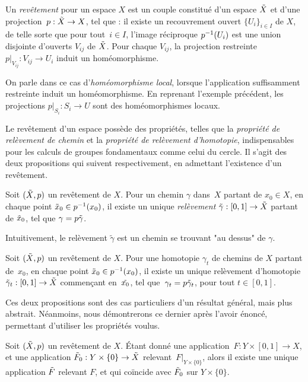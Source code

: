 \begin{definition}
Un \emph{revêtement} pour un espace $X$ est un couple constitué d'un espace $\Tilde{X}$ et d'une projection~$p:\Tilde{X}\to X$, tel que : il existe un recouvrement ouvert $\{U_i\}_{i\in I}$ de $X$, de telle sorte que pour tout~$i\in I$, l'image réciproque $p^{-1}(U_i)$ est une union disjointe d'ouverts $V_{ij}$ de $\Tilde{X}$. Pour chaque $V_{ij}$, la projection restreinte $p|_{V_{ij}}:V_{ij}\to U_i$ induit un homéomorphisme.
\end{definition}

On parle dans ce cas d'\emph{homéomorphisme local}, lorsque l'application suffisamment restreinte induit un homéomorphisme. En reprenant l'exemple précédent, les projections $p|_{S_i}:S_i\to U$ sont des homéomorphismes locaux.

\bigskip Le revêtement d'un espace possède des propriétés, telles que la \emph{propriété de relèvement de chemin} et la \emph{propriété de relèvement d'homotopie}, indispensables pour les calculs de groupes fondamentaux comme celui du cercle. Il s'agit des deux propositions qui suivent respectivement, en admettant l'existence d'un revêtement.

\begin{proposition}\label{prop:rel-path}
Soit $(\Tilde{X},p)$ un revêtement de $X$. Pour un chemin $\gamma$ dans~$X$ partant de $x_0\in X$, en chaque point $\Tilde{x}_0\in p^{-1}(x_0)$, il existe un unique \emph{relèvement} $\Tilde{\gamma}:[0,1]\to\Tilde{X}$ partant de $\Tilde{x}_0$, tel que $\gamma=p\Tilde{\gamma}$.
\end{proposition}

Intuitivement, le relèvement $\tilde{\gamma}$ est un chemin se trouvant "au dessus" de $\gamma$.

\begin{proposition}\label{prop:rel-hom}
Soit $(\Tilde{X},p)$ un revêtement de $X$. Pour une homotopie $\gamma_t$ de chemins de $X$ partant de~$x_0$, en chaque point $\Tilde{x}_0\in p^{-1}(x_0)$, il existe un unique relèvement d'homotopie $\Tilde{\gamma}_t:[0,1]\to\Tilde{X}$ commençant en~$\Tilde{x_0}$, tel que~$\gamma_t=p\Tilde{\gamma}_t$, pour tout $t\in[0,1]$.
\end{proposition}

Ces deux propositions sont des cas particuliers d'un résultat général, mais plus abstrait. Néanmoins, nous démontrerons ce dernier après l'avoir énoncé, permettant d'utiliser les propriétés voulus.

\begin{theorem}
Soit $(\Tilde{X},p)$ un revêtement de $X$. Étant donné une application~$F:Y\times[0,1]\to X$, et une application $\Tilde{F}_0:Y\times\{0\}\to\Tilde{X}$ relevant~$F|_{Y\times\{0\}}$, alors il existe une unique application $\Tilde{F}$ relevant $F$, et qui coïncide avec $\Tilde{F}_0$ sur $Y\times\{0\}$.
\end{theorem}

